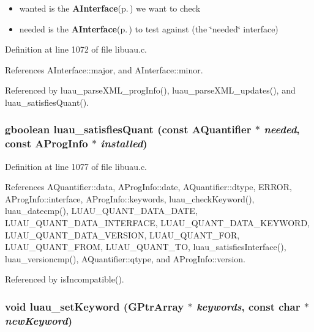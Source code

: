 \begin{itemize}
\item wanted is the {\bf AInterface}{\rm (p.\,\pageref{structAInterface})} we want to check \item needed is the {\bf AInterface}{\rm (p.\,\pageref{structAInterface})} to test against (the \char`\"{}needed\char`\"{} interface) 
\end{itemize}


Definition at line 1072 of file libuau.c.

References AInterface::major, and AInterface::minor.

Referenced by luau\_\-parse\-XML\_\-prog\-Info(), luau\_\-parse\-XML\_\-updates(), and luau\_\-satisfies\-Quant().
\subsubsection{\setlength{\rightskip}{0pt plus 5cm}gboolean luau\_\-satisfies\-Quant (const {\bf AQuantifier} $\ast$ {\em needed}, const {\bf AProg\-Info} $\ast$ {\em installed})}\label{libuau_8c_a39}




Definition at line 1077 of file libuau.c.

References AQuantifier::data, AProg\-Info::date, AQuantifier::dtype, ERROR, AProg\-Info::interface, AProg\-Info::keywords, luau\_\-check\-Keyword(), luau\_\-datecmp(), LUAU\_\-QUANT\_\-DATA\_\-DATE, LUAU\_\-QUANT\_\-DATA\_\-INTERFACE, LUAU\_\-QUANT\_\-DATA\_\-KEYWORD, LUAU\_\-QUANT\_\-DATA\_\-VERSION, LUAU\_\-QUANT\_\-FOR, LUAU\_\-QUANT\_\-FROM, LUAU\_\-QUANT\_\-TO, luau\_\-satisfies\-Interface(), luau\_\-versioncmp(), AQuantifier::qtype, and AProg\-Info::version.

Referenced by is\-Incompatible().
\subsubsection{\setlength{\rightskip}{0pt plus 5cm}void luau\_\-set\-Keyword (GPtr\-Array $\ast$ {\em keywords}, const char $\ast$ {\em new\-Keyword})}\label{libuau_8c_a31}


